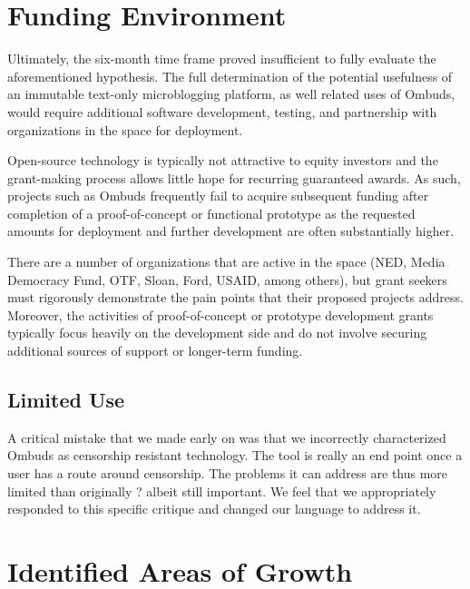 \documentclass[a4paper]{article}
\begin{document}
\section{Funding Environment}

Ultimately, the six-month time frame proved insufficient to fully evaluate the aforementioned hypothesis. The full determination of the potential usefulness of an immutable text-only microblogging platform, as well related uses of Ombuds, would require additional software development, testing, and partnership with organizations in the space for deployment.\par

Open-source technology is typically not attractive to equity investors and the grant-making process allows little hope for recurring guaranteed awards. As such, projects such as Ombuds frequently fail to acquire subsequent funding after completion of a proof-of-concept or functional prototype as the requested amounts for deployment and further development are often substantially higher.\par

There are a number of organizations that are active in the space (NED, Media Democracy Fund, OTF, Sloan, Ford, USAID, among others), but grant seekers must rigorously demonstrate the pain points that their proposed projects address. Moreover, the activities of proof-of-concept or prototype development grants typically focus heavily on the development side and do not involve securing additional sources of support or longer-term funding.\par

\subsection{Limited Use}

A critical mistake that we made early on was that we incorrectly characterized Ombuds as censorship resistant technology. The tool is really an end point once a user has a route around censorship. The problems it can address are thus more limited than originally ? albeit still important. We feel that we appropriately responded to this specific critique and changed our language to address it. \par

\section{Identified Areas of Growth}
\end{document}
